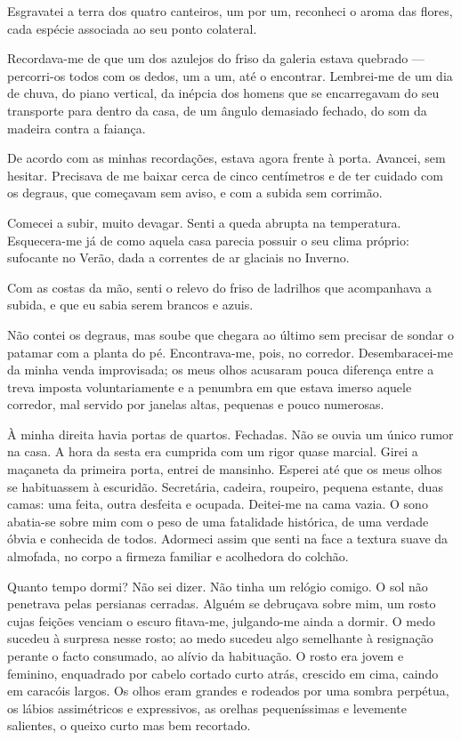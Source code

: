 Esgravatei a terra dos quatro canteiros, um por um, reconheci o aroma
das flores, cada espécie associada ao seu ponto colateral.

Recordava-me de que um dos azulejos do friso da galeria estava
quebrado --- percorri-os todos com os dedos, um a um, até o encontrar.
Lembrei-me de um dia de chuva, do piano vertical, da inépcia dos homens
que se encarregavam do seu transporte para dentro da casa, de um ângulo
demasiado fechado, do som da madeira contra a faiança.

De acordo com as minhas recordações, estava agora frente à porta.
Avancei, sem hesitar. Precisava de me baixar cerca
de cinco centímetros e de ter cuidado com os degraus, que começavam sem
aviso, e com a subida sem corrimão.

Comecei a subir, muito devagar. Senti a queda abrupta na temperatura.
Esquecera-me já de como aquela casa parecia possuir o seu clima próprio:
sufocante no Verão, dada a correntes de ar glaciais no Inverno.

Com as costas da mão, senti o relevo do friso de ladrilhos que
acompanhava a subida, e que eu sabia serem brancos e azuis.

Não contei os degraus, mas soube que chegara ao último sem precisar de
sondar o patamar com a planta do pé. Encontrava-me, pois, no corredor.
Desembaracei-me da minha venda improvisada; os meus olhos acusaram pouca
diferença entre a treva imposta voluntariamente e a penumbra em que
estava imerso aquele corredor, mal servido por janelas altas, pequenas e
pouco numerosas.

À minha direita havia portas de quartos. Fechadas. Não se ouvia um único
rumor na casa. A hora da sesta era cumprida com um rigor quase
marcial. Girei a maçaneta da primeira porta, entrei de mansinho. Esperei
até que os meus olhos se habituassem à escuridão. Secretária, cadeira,
roupeiro, pequena estante, duas camas: uma feita, outra desfeita e
ocupada. Deitei-me na cama vazia. O sono abatia-se sobre mim com o peso
de uma fatalidade histórica, de uma verdade óbvia e conhecida de
todos. Adormeci assim que senti na face a textura suave da almofada, no
corpo a firmeza familiar e acolhedora do colchão.

Quanto tempo dormi? Não sei dizer. Não tinha um relógio comigo. O sol
não penetrava pelas persianas cerradas. Alguém se debruçava sobre mim,
um rosto cujas feições venciam o escuro fitava-me, julgando-me ainda a
dormir.
O medo sucedeu à surpresa nesse rosto; ao medo sucedeu algo semelhante à
resignação perante o facto consumado, ao alívio da habituação. O rosto
era jovem e feminino, enquadrado por cabelo cortado curto atrás,
crescido em cima, caindo em caracóis largos. Os olhos eram grandes e
rodeados por uma sombra perpétua, os lábios assimétricos e
expressivos, as orelhas pequeníssimas e levemente salientes, o queixo
curto mas bem recortado.

